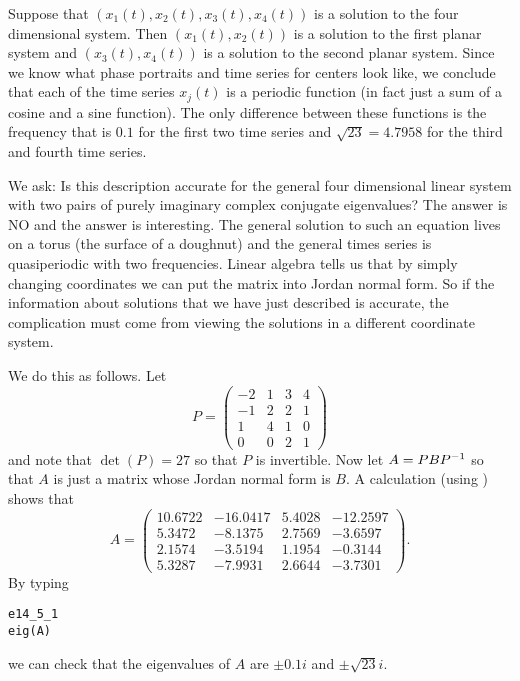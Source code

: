 \documentclass{ximera}
\begin{document}
Suppose that $(x_1(t),x_2(t),x_3(t),x_4(t))$ is a solution to the 
four dimensional system.  Then $(x_1(t),x_2(t))$ is a solution to the 
first planar system and $(x_3(t),x_4(t))$ is a solution to the second 
planar system.  Since we know what phase portraits
 and time series for
centers look like, we conclude that each of the time series $x_j(t)$ is
a periodic function (in fact just a sum of a cosine and a sine function).  
The only difference between these functions is the frequency that is 
$0.1$ for the first two time series and $\sqrt{23}=4.7958$ for the third 
and fourth time series.

We ask:  Is this description accurate for the general four dimensional linear 
system with two pairs of purely imaginary complex conjugate eigenvalues?  The 
answer is NO and the answer is interesting.  The general solution
 to such an equation lives on a torus 
(the surface of a doughnut) and the general times series is quasiperiodic
with two frequencies.  Linear algebra 
tells us that by simply changing coordinates we can put the matrix into 
Jordan normal form.  So if the information about 
solutions that we have just described is accurate, the complication must come 
from viewing the solutions in a different coordinate system.

We do this as follows.  Let
\[
P = \left(\begin{array}{rrrr}
   -2  &  1   &  3  &  4 \\
   -1  &  2   &  2  &  1 \\
    1  &  4   &  1  &  0\\
    0  &  0   &  2  &  1
\end{array}\right)
\]
and note that $\det(P)=27$ so that $P$ is invertible.  
Now let
$A=PBP^{-1}$ so that $A$ is just a matrix whose 
Jordan normal form is $B$.
A calculation (using \Matlabp) shows that
\begin{equation*}  \label{e:tor4}
A = \left(\begin{array}{rrrr}
   10.6722 &  -16.0417 &    5.4028 &  -12.2597\\
    5.3472 &   -8.1375 &    2.7569 &   -3.6597\\
    2.1574 &   -3.5194 &    1.1954 &   -0.3144\\
    5.3287 &   -7.9931 &    2.6644 &   -3.7301
\end{array}\right).
\end{equation*}
By typing
\begin{verbatim}
e14_5_1
eig(A)
\end{verbatim}
we can check that the eigenvalues of $A$ are $\pm0.1i$ and $\pm\sqrt{23}i$.
\end{document}
